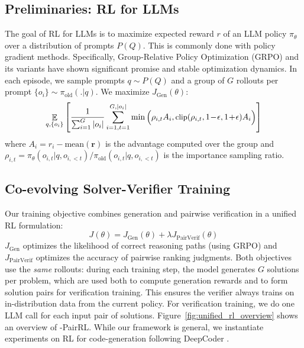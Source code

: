 \subsection{Preliminaries: RL for LLMs}
The goal of RL for LLMs is to maximize expected reward $r$ of an LLM policy $\pi_\theta$ over a distribution of prompts $P(Q)$. This is commonly done with policy gradient methods. Specifically, Group-Relative Policy Optimization (GRPO) \cite{deepseekai2025deepseekr1incentivizingreasoningcapability} and its variants \cite{yu2025dapoopensourcellmreinforcement} have shown significant promise and stable optimization dynamics. In each episode, we sample prompts $q \sim P(Q)$ and a group of $G$ rollouts per prompt $ \{o_i\} \sim \pi_{\text{old}}(.|q)$. We maximize $J_{\text{Gen}}(\theta)$:
{\begin{equation} \small
    \mathop{\mathbb{E}}_{q, \{o_i\}}\left[ \frac{1}{\sum_{i=1}^G|o_i|} \sum_{i=1,t=1}^{G,|o_i|} \min \Big( \rho_{i,t} A_i, \text{clip}(\rho_{i,t}, 1\!-\!\epsilon, 1\!+\!\epsilon) A_i \Big) \right]
\end{equation}}
where $A_i = r_i - \text{mean}(\mathbf{r})$ is the advantage computed over the group and $\rho_{i,t} = \pi_\theta(o_{i,t} | q, o_{i,<t}) / \pi_{\text{old}}(o_{i,t} | q, o_{i,<t})$ is the importance sampling ratio.

\subsection{Co-evolving Solver-Verifier Training}
Our training objective combines generation and pairwise verification in a unified RL formulation:
\begin{equation}
    J(\theta) = J_{\text{Gen}}(\theta) + \lambda J_{\text{PairVerif}}(\theta)
\end{equation}
$J_{\text{Gen}}$ optimizes the likelihood of correct reasoning paths (using GRPO) and $J_{\text{PairVerif}}$ optimizes the accuracy of pairwise ranking judgments. Both objectives use the \textit{same} rollouts: during each training step, the model generates $G$ solutions per problem, which are used both to compute generation rewards and to form solution pairs for verification training.
This ensures the verifier always trains on in-distribution data from the current policy. For verification training, we do one LLM call for each input pair of solutions. Figure~\ref{fig:unified_rl_overview} shows an overview of \method{}-PairRL. While our framework is general, we instantiate experiments on RL for code-generation following DeepCoder \citep{deepcoder2025}.

